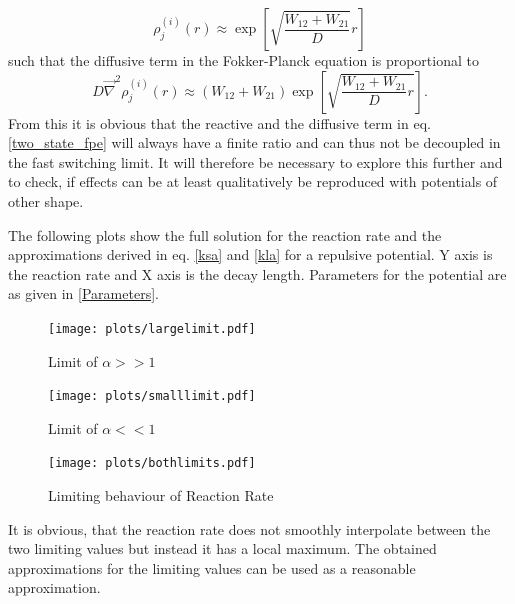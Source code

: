 \begin{equation}
    \rho^{(i)}_{j}(r) \approx \exp\left[\sqrt{\frac{W_{12}+W_{21}}{D}}r\right]
    \label{rate_dependence_of_ind_sol}
\end{equation}
such that the diffusive term in the Fokker-Planck equation is proportional to
\begin{equation}
D\vec{\nabla}^{2}\rho^{(i)}_{j}(r) \approx (W_{12}+W_{21})\exp\left[\sqrt{\frac{W_{12}+W_{21}}{D}r}\right].
    \label{rate_dependence_of_dif_term}
\end{equation}
From this it is obvious that the reactive and the diffusive term in eq. \eqref{two_state_fpe} will always have a finite ratio and can thus not be decoupled in the fast switching limit.
It will therefore be necessary to explore this further and to check, if effects can be at least qualitatively be reproduced with potentials of other shape. \par
The following plots show the full solution for the reaction rate and the approximations derived in eq. \eqref{ksa} and \eqref{kla} for a repulsive potential. Y axis is the reaction rate and X axis is the decay length. Parameters for the potential are as given in \eqref{Parameters}. \par
\begin{minipage}[t]{0.5 \textwidth}
    \begin{figure}[H]
        \texttt{[image: plots/largelimit.pdf]}
    \caption{Limit of $\alpha >>1$}
    \end{figure}
\end{minipage}\begin{minipage}[t]{0.49 \textwidth}
    \begin{figure}[H]
        \texttt{[image: plots/smalllimit.pdf]}
    \caption{Limit of $\alpha <<1$}
    \end{figure}
\end{minipage}
\begin{figure}[H]
    \centering
    \texttt{[image: plots/bothlimits.pdf]}
    \caption{Limiting behaviour of Reaction Rate}
    \label{fig:rrlimit}
\end{figure}
It is obvious, that the reaction rate does not smoothly interpolate between the two limiting values but instead it has a local maximum. The obtained approximations for the limiting values can be used as a reasonable approximation.
